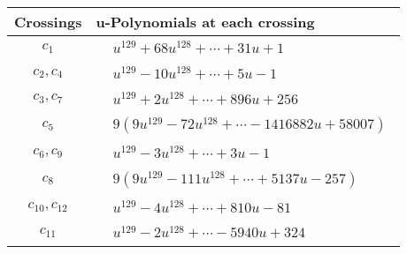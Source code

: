 \documentclass[1p]{elsarticle_modified}
\theoremstyle{definition}
\begin{document}
\begin{tabular}{m{50pt}|m{274pt}}
Crossings & \hspace{64pt}u-Polynomials at each crossing \\
\hline $$\begin{aligned}c_{1}\end{aligned}$$&$\begin{aligned}
&u^{129}+68 u^{128}+\cdots+31 u+1
\end{aligned}$\\
\hline $$\begin{aligned}c_{2},c_{4}\end{aligned}$$&$\begin{aligned}
&u^{129}-10 u^{128}+\cdots+5 u-1
\end{aligned}$\\
\hline $$\begin{aligned}c_{3},c_{7}\end{aligned}$$&$\begin{aligned}
&u^{129}+2 u^{128}+\cdots+896 u+256
\end{aligned}$\\
\hline $$\begin{aligned}c_{5}\end{aligned}$$&$\begin{aligned}
&9(9 u^{129}-72 u^{128}+\cdots-1416882 u+58007)
\end{aligned}$\\
\hline $$\begin{aligned}c_{6},c_{9}\end{aligned}$$&$\begin{aligned}
&u^{129}-3 u^{128}+\cdots+3 u-1
\end{aligned}$\\
\hline $$\begin{aligned}c_{8}\end{aligned}$$&$\begin{aligned}
&9(9 u^{129}-111 u^{128}+\cdots+5137 u-257)
\end{aligned}$\\
\hline $$\begin{aligned}c_{10},c_{12}\end{aligned}$$&$\begin{aligned}
&u^{129}-4 u^{128}+\cdots+810 u-81
\end{aligned}$\\
\hline $$\begin{aligned}c_{11}\end{aligned}$$&$\begin{aligned}
&u^{129}-2 u^{128}+\cdots-5940 u+324
\end{aligned}$\\
\hline
\end{tabular}\\~\\
\end{document}
